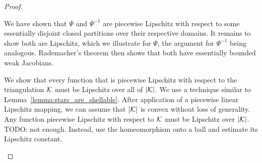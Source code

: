 \documentclass[10pt,a4paper]{article}
\newcommand{\mwl}[1]{{\color{red}#1}}
\begin{document}
\begin{proof}
\begin{itemize}
        We have shown that $\Psi$ and $\Psi^{-1}$ are piecewise Lipschitz with respect to some essentially disjoint closed partitions over their respective domains.
        It remains to show both are Lipschitz, which we illustrate for $\Psi$, the argument for $\Psi^{-1}$ being analogous. 
        Rademacher's theorem then shows that both have essentially bounded weak Jacobians. 
        
        We show that every function that is piecewise Lipschitz with respect to the triangulation ${\mathcal K}$ must be Lipschitz over all of $|{\mathcal K}|$. 
        We use a technique similar to Lemma~\ref{lemma:stars_are_shellable}. 
        After application of a piecewise linear Lipschitz mapping, 
        we can assume that $|{\mathcal K}|$ is convex without loss of generality. 
        Any function piecewise Lipschitz with respect to ${\mathcal K}$ must be Lipschitz over $|{\mathcal K}|$. 
        \mwl{TODO: not enough. Instead, use the homeomorphism onto a ball and estimate its Lipschitz constant.}
        

\end{itemize}
\end{proof}
\end{document}
